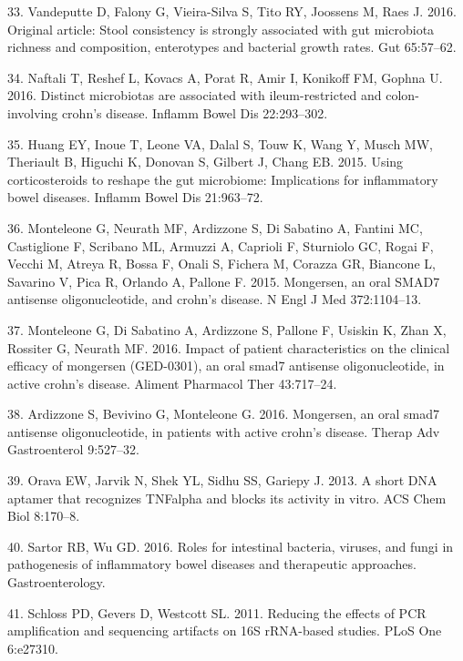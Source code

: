 \documentclass[11pt,]{article}
\begin{document}
\hypertarget{ref-vandeputte_stoolcon_2016}{}
33. Vandeputte D, Falony G, Vieira-Silva S, Tito RY, Joossens M, Raes J.
2016. Original article: Stool consistency is strongly associated with
gut microbiota richness and composition, enterotypes and bacterial
growth rates. Gut 65:57--62.

\hypertarget{ref-naftali_tissinvol_2016}{}
34. Naftali T, Reshef L, Kovacs A, Porat R, Amir I, Konikoff FM, Gophna
U. 2016. Distinct microbiotas are associated with ileum-restricted and
colon-involving crohn's disease. Inflamm Bowel Dis 22:293--302.

\hypertarget{ref-huang_cort_2015}{}
35. Huang EY, Inoue T, Leone VA, Dalal S, Touw K, Wang Y, Musch MW,
Theriault B, Higuchi K, Donovan S, Gilbert J, Chang EB. 2015. Using
corticosteroids to reshape the gut microbiome: Implications for
inflammatory bowel diseases. Inflamm Bowel Dis 21:963--72.

\hypertarget{ref-monteleone_mongersen_2015}{}
36. Monteleone G, Neurath MF, Ardizzone S, Di Sabatino A, Fantini MC,
Castiglione F, Scribano ML, Armuzzi A, Caprioli F, Sturniolo GC, Rogai
F, Vecchi M, Atreya R, Bossa F, Onali S, Fichera M, Corazza GR, Biancone
L, Savarino V, Pica R, Orlando A, Pallone F. 2015. Mongersen, an oral
SMAD7 antisense oligonucleotide, and crohn's disease. N Engl J Med
372:1104--13.

\hypertarget{ref-monteleone_mongersen_2016}{}
37. Monteleone G, Di Sabatino A, Ardizzone S, Pallone F, Usiskin K, Zhan
X, Rossiter G, Neurath MF. 2016. Impact of patient characteristics on
the clinical efficacy of mongersen (GED-0301), an oral smad7 antisense
oligonucleotide, in active crohn's disease. Aliment Pharmacol Ther
43:717--24.

\hypertarget{ref-ardizzone_mongersen_2016}{}
38. Ardizzone S, Bevivino G, Monteleone G. 2016. Mongersen, an oral
smad7 antisense oligonucleotide, in patients with active crohn's
disease. Therap Adv Gastroenterol 9:527--32.

\hypertarget{ref-orava_short_2013}{}
39. Orava EW, Jarvik N, Shek YL, Sidhu SS, Gariepy J. 2013. A short DNA
aptamer that recognizes TNFalpha and blocks its activity in vitro. ACS
Chem Biol 8:170--8.

\hypertarget{ref-sartor_microbesIBD_2016}{}
40. Sartor RB, Wu GD. 2016. Roles for intestinal bacteria, viruses, and
fungi in pathogenesis of inflammatory bowel diseases and therapeutic
approaches. Gastroenterology.

\hypertarget{ref-schloss_PCRartifacts_2011}{}
41. Schloss PD, Gevers D, Westcott SL. 2011. Reducing the effects of PCR
amplification and sequencing artifacts on 16S rRNA-based studies. PLoS
One 6:e27310.
\end{document}
